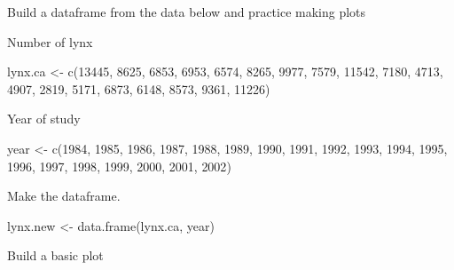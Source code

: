 \documentclass[
]{book}
\newenvironment{Shaded}{\begin{snugshade}}{\end{snugshade}}
\newcommand{\DecValTok}[1]{\textcolor[rgb]{0.00,0.00,0.81}{#1}}
\newcommand{\FunctionTok}[1]{\textcolor[rgb]{0.00,0.00,0.00}{#1}}
\newcommand{\NormalTok}[1]{#1}
\newcommand{\OtherTok}[1]{\textcolor[rgb]{0.56,0.35,0.01}{#1}}
\begin{document}
Build a dataframe from the data below and practice making plots

Number of lynx

\begin{Shaded}
\begin{Highlighting}[]
\NormalTok{lynx.ca }\OtherTok{\textless{}{-}} \FunctionTok{c}\NormalTok{(}\DecValTok{13445}\NormalTok{, }\DecValTok{8625}\NormalTok{, }\DecValTok{6853}\NormalTok{, }\DecValTok{6953}\NormalTok{, }\DecValTok{6574}\NormalTok{,}
  \DecValTok{8265}\NormalTok{, }\DecValTok{9977}\NormalTok{, }\DecValTok{7579}\NormalTok{, }\DecValTok{11542}\NormalTok{, }\DecValTok{7180}\NormalTok{,}
  \DecValTok{4713}\NormalTok{, }\DecValTok{4907}\NormalTok{, }\DecValTok{2819}\NormalTok{, }\DecValTok{5171}\NormalTok{, }\DecValTok{6873}\NormalTok{, }
  \DecValTok{6148}\NormalTok{, }\DecValTok{8573}\NormalTok{, }\DecValTok{9361}\NormalTok{, }\DecValTok{11226}\NormalTok{)}
\end{Highlighting}
\end{Shaded}

Year of study

\begin{Shaded}
\begin{Highlighting}[]
\NormalTok{year }\OtherTok{\textless{}{-}} \FunctionTok{c}\NormalTok{(}\DecValTok{1984}\NormalTok{, }\DecValTok{1985}\NormalTok{, }\DecValTok{1986}\NormalTok{, }\DecValTok{1987}\NormalTok{,}
          \DecValTok{1988}\NormalTok{, }\DecValTok{1989}\NormalTok{, }\DecValTok{1990}\NormalTok{, }\DecValTok{1991}\NormalTok{, }\DecValTok{1992}\NormalTok{, }
          \DecValTok{1993}\NormalTok{, }\DecValTok{1994}\NormalTok{, }\DecValTok{1995}\NormalTok{, }\DecValTok{1996}\NormalTok{, }\DecValTok{1997}\NormalTok{,}
          \DecValTok{1998}\NormalTok{, }\DecValTok{1999}\NormalTok{, }\DecValTok{2000}\NormalTok{, }\DecValTok{2001}\NormalTok{, }\DecValTok{2002}\NormalTok{)}
\end{Highlighting}
\end{Shaded}

Make the dataframe.

\begin{Shaded}
\begin{Highlighting}[]
\NormalTok{lynx.new }\OtherTok{\textless{}{-}} \FunctionTok{data.frame}\NormalTok{(lynx.ca,}
\NormalTok{                    year)}
\end{Highlighting}
\end{Shaded}

Build a basic plot
\end{document}
